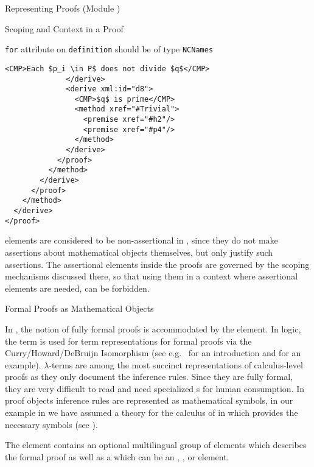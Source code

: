 \begin{tchapter}[id=proofs,short=Representing Proofs]{Representing Proofs (Module {})}
\begin{tsection}[id=proofs:scoping]{Scoping and Context in a Proof}
\begin{erratum}[reported-by=Michael Kohlhase,date=2009-08-11]{{\texttt{for}} attribute on
    {\texttt{definition}} should be of type {\texttt{NCNames}}}
\begin{lstlisting}[label=lst:primes-omdoc,mathescape,
  caption={A top-down Representation of the Proof in {\myfigref{pf-example1-math}}.},
  index={symbol,definition}]
                <CMP>Each $p_i \in P$ does not divide $q$</CMP>
              </derive>
              <derive xml:id="d8">
                <CMP>$q$ is prime</CMP>
                <method xref="#Trivial">
                  <premise xref="#h2"/>
                  <premise xref="#p4"/>
                </method>
              </derive>
            </proof>
          </method>
        </derive>
      </proof>
    </method>
  </derive>
</proof>
\end{lstlisting}
\end{erratum}

{} elements are considered to be
non-assertional in {\omdoc}, since they do not make
assertions about mathematical objects themselves, but only justify such assertions.
The assertional elements inside the proofs are governed by the scoping mechanisms
discussed there, so that using them in a context where assertional elements are
needed, can be forbidden. 
\end{tsection}

\begin{tsection}[id=proofobjects]{Formal Proofs as Mathematical Objects}
  
  In {\omdoc}, the notion of fully formal proofs is accommodated by the
  {} element. In logic, the term {} is used for
  term representations for formal proofs via the Curry/Howard/DeBruijn Isomorphism (see
  e.g.~\cite{Thompson91} for an introduction and {} for an example).
  $\lambda$-terms are among the most succinct representations of calculus-level proofs as
  they only document the inference rules. Since they are fully formal, they are very
  difficult to read and need specialized {s} for
  human consumption. In proof objects inference rules are represented as mathematical
  symbols, in our example in {} we have assumed a theory
  {} for the calculus of {} in
  {} which provides the necessary symbols (see
  {}).
  
  The {} element contains an optional multilingual group of
  {} elements which describes the formal proof as well as a
  {} which can be an {},
  {}, or {} element.


\end{tsection}
\end{tchapter}
